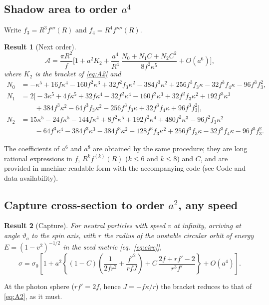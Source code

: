 \documentclass[11pt,a4paper]{article}
\newtheorem{result}{Result}
\theoremstyle{remark}
\numberwithin{equation}{section}
\begin{document}
\subsection{Shadow area to order \texorpdfstring{$a^4$}{a4}}
Write $f_3=R^3f'''(R)$ and $f_4=R^4f''''(R)$.
\begin{result}[Next order]\label{res:A4}
\begin{equation}
\mathcal A=\frac{\pi R^2}{f}\Big[1+a^2K_2+\frac{a^4}{R^4}\,\frac{N_0+N_1C+N_2C^2}{8f^2\kappa^5}+O(a^6)\Big],
\label{eq:A4}
\end{equation}
where $K_2$ is the bracket of \eqref{eq:A2} and
\begin{align}
N_0&=-\kappa^5+16f\kappa^4-160f^2\kappa^3+32f^2f_3\kappa^2-384f^3\kappa^2+256f^3f_3\kappa-32f^3f_4\kappa-96f^3f_3^2,\label{eq:N0}\\
N_1&=2\big[-3\kappa^5+4f\kappa^5+32f\kappa^4-32f^2\kappa^4-160f^2\kappa^3+32f^2f_3\kappa^2+192f^3\kappa^3\nonumber\\
&\qquad+384f^3\kappa^2-64f^3f_3\kappa^2-256f^3f_3\kappa+32f^3f_4\kappa+96f^3f_3^2\big],\label{eq:N1}\\
N_2&=15\kappa^5-24f\kappa^5-144f\kappa^4+8f^2\kappa^5+192f^2\kappa^4+480f^2\kappa^3-96f^2f_3\kappa^2\nonumber\\
&\qquad-64f^3\kappa^4-384f^3\kappa^3-384f^3\kappa^2+128f^3f_3\kappa^2+256f^3f_3\kappa-32f^3f_4\kappa-96f^3f_3^2.\label{eq:N2}
\end{align}
\end{result}
The coefficients of $a^6$ and $a^8$ are obtained by the same procedure; they are long rational
expressions in $f$, $R^kf^{(k)}(R)$ ($k\le6$ and $k\le8$) and $C$, and are provided in machine-readable
form with the accompanying code (see Code and data availability).

\subsection{Capture cross-section to order \texorpdfstring{$a^2$}{a2}, any speed}
\begin{result}[Capture]\label{res:sig2}
For neutral particles with speed $v$ at infinity, arriving at angle $\vartheta_o$ to the spin axis,
with $r$ the radius of the unstable circular orbit of energy $E=(1-v^2)^{-1/2}$ in the seed metric
[eq.~\eqref{eq:circ}],
\begin{equation}
\sigma=\sigma_0\left[1+a^2\left\{(1-C)\left(\frac{1}{2fr^2}+\frac{f'^2}{rfJ}\right)
+C\,\frac{2f+rf'-2}{r^3f'}\right\}+O(a^4)\right].
\label{eq:sig2}
\end{equation}
\end{result}
At the photon sphere ($rf'=2f$, hence $J=-f\kappa/r$) the bracket reduces to that of
\eqref{eq:A2}, as it must.
\end{document}
